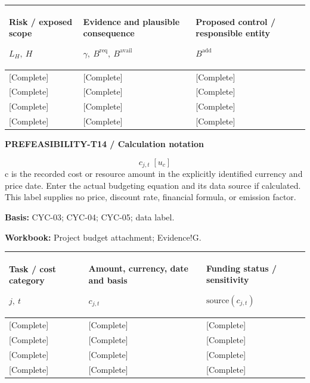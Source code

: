 {\sffamily\fontsize{8.3}{10.3}\selectfont\begin{longtable}{@{}P{51.14mm} P{56.09mm} P{57.74mm}@{}}
\toprule
\textbf{Risk / exposed scope}\par {\normalfont\fontsize{8.2}{10}\selectfont $L_H,\ H$} & \textbf{Evidence and plausible consequence}\par {\normalfont\fontsize{8.2}{10}\selectfont $\gamma,\ B^{\mathrm{req}},\ B^{\mathrm{avail}}$} & \textbf{Proposed control / responsible entity}\par {\normalfont\fontsize{8.2}{10}\selectfont $B^{\mathrm{add}}$}\\\midrule\endhead
\rule{0pt}{7.7mm}[Complete] & [Complete] & [Complete]\\\hline
\rule{0pt}{7.7mm}[Complete] & [Complete] & [Complete]\\\hline
\rule{0pt}{7.7mm}[Complete] & [Complete] & [Complete]\\\hline
\rule{0pt}{7.7mm}[Complete] & [Complete] & [Complete]\\\hline
\end{longtable}}
\par\begingroup\sffamily\fontsize{8}{10}\selectfont\color{NEBGreen}\setlength{\parskip}{2pt}\setlength{\abovedisplayskip}{4pt}\setlength{\belowdisplayskip}{4pt}\setlength{\abovedisplayshortskip}{2pt}\setlength{\belowdisplayshortskip}{3pt}
\textbf{PREFEASIBILITY-T14 / Calculation notation}\par
{\fontsize{9}{11}\selectfont\[ c_{j,t}\;[u_c] \]}
c is the recorded cost or resource amount in the explicitly identified currency and price date. Enter the actual budgeting equation and its data source if calculated. This label supplies no price, discount rate, financial formula, or emission factor.\par
\textbf{Basis:} CYC-03; CYC-04; CYC-05; data label.\par
\textbf{Workbook:} Project budget attachment; Evidence!G.\par\endgroup
{\sffamily\fontsize{8.3}{10.3}\selectfont\begin{longtable}{@{}P{49.49mm} P{64.34mm} P{51.14mm}@{}}
\toprule
\textbf{Task / cost category}\par {\normalfont\fontsize{8.2}{10}\selectfont $j,\ t$} & \textbf{Amount, currency, date and basis}\par {\normalfont\fontsize{8.2}{10}\selectfont $c_{j,t}$} & \textbf{Funding status / sensitivity}\par {\normalfont\fontsize{8.2}{10}\selectfont $\text{source}(c_{j,t})$}\\\midrule\endhead
\rule{0pt}{7.7mm}[Complete] & [Complete] & [Complete]\\\hline
\rule{0pt}{7.7mm}[Complete] & [Complete] & [Complete]\\\hline
\rule{0pt}{7.7mm}[Complete] & [Complete] & [Complete]\\\hline
\rule{0pt}{7.7mm}[Complete] & [Complete] & [Complete]\\\hline
\end{longtable}}
